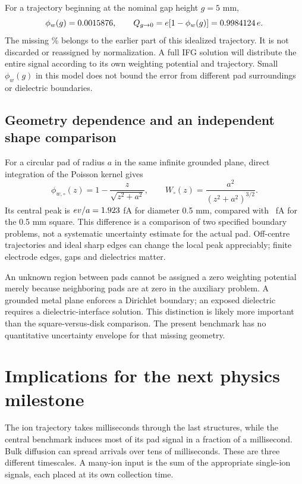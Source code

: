 \documentclass[11pt,a4paper]{article}
\begin{document}
For a trajectory beginning at the nominal gap height $g=5$ mm,
\begin{equation}
 \phi_w(g)=0.0015876,\qquad
 Q_{g\to0}=e[1-\phi_w(g)]=0.9984124\,e.
\end{equation}
The missing \GapMissingPercent\% belongs to the earlier part of this idealized
trajectory. It is not discarded or reassigned by normalization. A full IFG
solution will distribute the entire signal according to its own weighting
potential and trajectory. Small $\phi_w(g)$ in this model does not bound the
error from different pad surroundings or dielectric boundaries.

\clearpage
\subsection{Geometry dependence and an independent shape comparison}
For a circular pad of radius $a$ in the same infinite grounded plane, direct
integration of the Poisson kernel gives
\begin{equation}
 \phi_{w,\circ}(z)=1-\frac{z}{\sqrt{z^2+a^2}},\qquad
 W_\circ(z)=\frac{a^2}{(z^2+a^2)^{3/2}}.
\end{equation}
Its central peak is $ev/a=1.923$ fA for diameter 0.5 mm, compared
with \PeakCurrent\ fA for the 0.5 mm square. This difference is a comparison
of two specified boundary problems, not a systematic uncertainty estimate for
the actual pad. Off-centre trajectories and ideal sharp edges can change the
local peak appreciably; finite electrode edges, gaps and dielectrics matter.

\begin{table}[ht]
\centering

\caption{Square-pad sensitivity and central current at selected heights. The
row at $z=0$ gives the pre-collection limit, not the current after absorption.}
\end{table}

An unknown region between pads cannot be assigned a zero weighting potential
merely because neighboring pads are at zero in the auxiliary problem. A
grounded metal plane enforces a Dirichlet boundary; an exposed dielectric
requires a dielectric-interface solution. This distinction is likely more
important than the square-versus-disk comparison. The present benchmark has
no quantitative uncertainty envelope for that missing geometry.

\section{Implications for the next physics milestone}
The ion trajectory takes milliseconds through the last structures, while the
central benchmark induces most of its pad signal in a fraction of a millisecond.
Bulk diffusion can spread arrivals over tens of milliseconds. These are three
different timescales. A many-ion input is the sum of the appropriate single-ion
signals, each placed at its own collection time.
\end{document}
